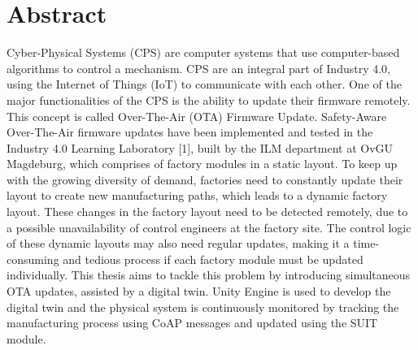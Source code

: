 \section*{Abstract}
\begin{spacing}{1.3}

Cyber-Physical Systems (CPS) are computer systems that use computer-based algorithms to control a mechanism. CPS are an integral part of Industry 4.0, using the Internet of Things (IoT) to communicate with each other. One of the major functionalities of the CPS is the ability to update their firmware remotely. This concept is called Over-The-Air (OTA) Firmware Update. Safety-Aware Over-The-Air firmware updates have been implemented and tested in the Industry 4.0 Learning Laboratory [1], built by the ILM department at OvGU Magdeburg, which comprises of factory modules in a static layout. To keep up with the growing diversity of demand, factories need to constantly update their layout to create new manufacturing paths, which leads to a dynamic factory layout. These changes in the factory layout need to be detected remotely, due to a possible unavailability of control engineers at the factory site. The control logic of these dynamic layouts may also need regular updates, making it a time-consuming and tedious process if each factory module must be updated individually. This thesis aims to tackle this problem by introducing simultaneous OTA updates, assisted by a digital twin. Unity Engine is used to develop the digital twin and the physical system is continuously monitored by tracking the manufacturing process using CoAP messages and updated using the SUIT module. 
\end{spacing}


\cleardoublepage




